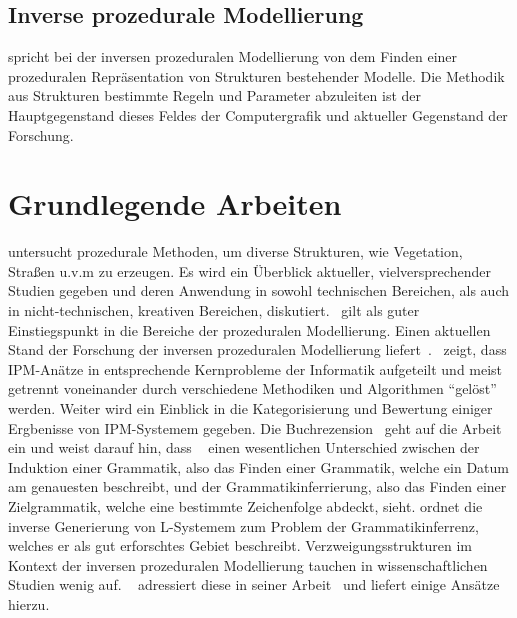 \subsection*{Inverse prozedurale Modellierung}
\citeauthor{aliaga_2016} spricht bei der inversen prozeduralen Modellierung von dem Finden einer prozeduralen Repräsentation
von Strukturen bestehender Modelle.
Die Methodik aus Strukturen bestimmte Regeln und Parameter abzuleiten ist der Hauptgegenstand dieses Feldes der
Computergrafik und aktueller Gegenstand der Forschung.

\section{Grundlegende Arbeiten}

\citeauthor{smelik_2014} untersucht prozedurale Methoden, um diverse Strukturen, wie Vegetation, Straßen u.v.m zu erzeugen.
Es wird ein Überblick aktueller, vielversprechender Studien gegeben und deren Anwendung in sowohl technischen Bereichen,
als auch in nicht-technischen, kreativen Bereichen, diskutiert.~\cite{smelik_2014} gilt als guter Einstiegspunkt in die
Bereiche der prozeduralen Modellierung.
Einen aktuellen Stand der Forschung der inversen prozeduralen Modellierung liefert~\cite{aliaga_2016}.~\citeauthor{aliaga_2016}
zeigt, dass IPM-Anätze in entsprechende Kernprobleme der Informatik aufgeteilt und meist getrennt voneinander durch
verschiedene Methodiken und Algorithmen "`gelöst"' werden.
Weiter wird ein Einblick in die Kategorisierung und Bewertung einiger Ergbenisse von IPM-Systemem gegeben.
Die Buchrezension~\cite{daelemans_2010} geht auf die Arbeit~\cite{higuera_2010} ein und weist darauf hin, dass
~\citeauthor{higuera_2010} einen wesentlichen Unterschied zwischen der Induktion einer Grammatik, also das Finden einer
Grammatik, welche ein Datum am genauesten beschreibt, und der Grammatikinferrierung, also das Finden einer Zielgrammatik,
welche eine bestimmte Zeichenfolge abdeckt, sieht.
\citeauthor{higuera_2010} ordnet die inverse Generierung von L-Systemem zum Problem der Grammatikinferrenz, welches er
als gut erforschtes Gebiet beschreibt.
Verzweigungsstrukturen im Kontext der inversen prozeduralen Modellierung tauchen in wissenschaftlichen Studien wenig auf.
~\cite{guo_2020} adressiert diese in seiner Arbeit~\cite{guo_2020} und liefert einige Ansätze hierzu.\\~\\

